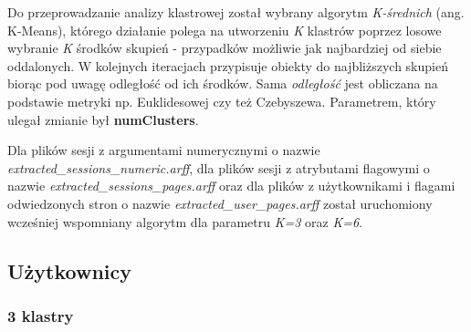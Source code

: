 \documentclass[../EDI_Task1_Karwowski_Kowalewski.tex]{subfiles}
\begin{document}
 {

    Do przeprowadzanie analizy klastrowej został wybrany algorytm \textit{K-średnich}
    (ang. K-Means), którego działanie polega na utworzeniu \textit{K} klastrów
    poprzez losowe wybranie \textit{K} środków skupień - przypadków możliwie jak
    najbardziej od siebie oddalonych. W kolejnych iteracjach przypisuje obiekty do
    najbliższych skupień biorąc pod uwagę odległość od ich środków. Sama
    \textit{odległość} jest obliczana na podstawie metryki np. Euklidesowej czy też
    Czebyszewa. Parametrem, który ulegał zmianie był \textbf{numClusters}.

    Dla plików sesji z argumentami numerycznymi o nazwie
    \textit{extracted\_sessions\_numeric.arff}, dla plików sesji z atrybutami
    flagowymi o nazwie \textit{extracted\_sessions\_pages.arff} oraz dla plików z
    użytkownikami i flagami odwiedzonych stron o nazwie
    \textit{extracted\_user\_pages.arff} został uruchomiony wcześniej wspomniany
    algorytm dla parametru \textit{K=3} oraz \textit{K=6}.

    \subsection{Użytkownicy} {

        \subsubsection{3 klastry}
        \label{sec:user_k_3} {

}}}
\end{document}
